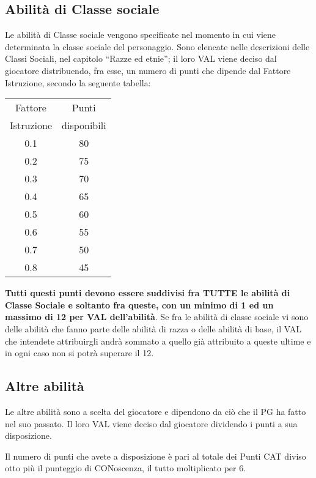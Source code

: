 \subsection{Abilit\`a di Classe sociale}

Le abilit\`a di Classe sociale vengono specificate nel momento in
cui viene determinata la classe sociale del personaggio. Sono elencate
nelle descrizioni delle Classi Sociali, nel capitolo ``Razze ed
etnie''; il loro VAL viene deciso dal giocatore distribuendo, fra
esse, un numero di punti che dipende dal Fattore Istruzione, secondo
la seguente tabella:

\begin{center}
\begin{tabular}{|c|c|}
\hline 
Fattore&Punti\\
Istruzione & disponibili \\ \hline\hline
0.1& 80 \\ \hline
 0.2& 75\\ \hline
 0.3& 70 \\ \hline
0.4& 65 \\ \hline
0.5& 60\\ \hline
 0.6& 55 \\ \hline
0.7& 50\\ \hline
 0.8& 45\\ \hline
\end{tabular}
\end{center}

\textbf{Tutti questi punti devono essere suddivisi fra TUTTE le abilit\`a di
Classe Sociale e soltanto fra queste, con un minimo di 1 ed un massimo
di 12 per VAL dell'abilit\`a}. Se fra le abilit\`a di classe
sociale vi sono delle abilit\`a che fanno parte delle abilit\`a di
razza o delle abilit\`a di base, il VAL che intendete attribuirgli
andr\`a sommato a quello gi\`a attribuito a queste ultime e in
ogni caso non si potr\`a superare il 12.  


\subsection{Altre abilit\`a}

Le altre abilit\`a sono a scelta del giocatore e dipendono da
ci\`o che il PG ha fatto nel suo passato. Il loro VAL viene deciso
dal giocatore dividendo i punti a sua disposizione.

Il numero di punti che avete a disposizione \`e pari al totale dei
Punti CAT diviso otto pi\`u il punteggio di CONoscenza, il tutto
moltiplicato per 6.

